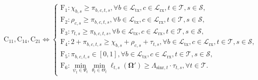 \documentclass[10pt,journal,compsoc]{IEEEtran}
\theoremstyle{myremark}
\theoremstyle{myexample}
\begin{document}
\begin{figure}[!b]
	\hrulefill
		\begin{align} \nonumber
			\mathrm{C}_{11}, \mathrm{C}_{14}, \mathrm{C}_{21} \Leftrightarrow
				\begin{cases}
					   	\mathrm{F}_{1}: \chi_{b,s} \geq \pi_{b,c,t,s}, \forall b \in \mathcal{L}_\mathrm{tx}, c \in \mathcal{L}_\mathrm{rx}, t \in \mathcal{T}, s \in \mathcal{S}, 
					   	\\
					   	\mathrm{F}_{2}: \rho_{c,s} \geq \pi_{b,c,t,s}, \forall b \in \mathcal{L}_\mathrm{tx}, c \in \mathcal{L}_\mathrm{rx}, t \in \mathcal{T}, s \in \mathcal{S},
					   	\\	
					   	\mathrm{F}_{3}: \tau_{t,s} \geq \pi_{b,c,t,s}, \forall b \in \mathcal{L}_\mathrm{tx}, c \in \mathcal{L}_\mathrm{rx}, t \in \mathcal{T}, s \in \mathcal{S},
					   	\\
					   	\mathrm{F}_{4}: 2 + \pi_{b,c,t,s} \geq \chi_{b,s} + \rho_{c,s} + \tau_{t,s}, \forall b \in \mathcal{L}_\mathrm{tx}, c \in \mathcal{L}_\mathrm{rx}, t \in \mathcal{T}, s \in \mathcal{S},
					   	\\
					   	\mathrm{F}_{5}: \pi_{b,c,t,s} \in \left[ 0, 1 \right], \forall b \in \mathcal{L}_\mathrm{tx}, c \in \mathcal{L}_\mathrm{rx}, t \in \mathcal{T}, s \in \mathcal{S},
					   	\\
					   	\mathrm{F}_{6}: \min_{\psi_t \in \Psi_t} \min_{\theta_t \in \Theta_t} \ell_{t,s} (\boldsymbol{\Omega}')
					   	\geq \Lambda_{\mathrm{sinr},t} \cdot \tau_{t,s}, \forall t \in \mathcal{T}.
				\end{cases}
		\end{align}
\end{figure}
\end{document}
